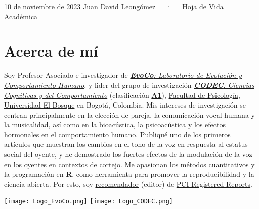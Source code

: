 \documentclass[11pt,a4paper,]{awesome-cv}
\begin{document}
\makecvheader

\makecvfooter
  {10 de noviembre de 2023}
    {Juan David Leongómez~~~·~~~Hoja de Vida Académica}
  {\thepage}





\hypertarget{acerca-de-muxed}{%
\section{Acerca de mí}\label{acerca-de-muxed}}

\begin{minipage}[c]{0.85\linewidth}
Soy Profesor Asociado e investigador de \href{https://jdleongomez.info/es/team/}{\textit{\textbf{EvoCo}: Laboratorio de Evolución y Comportamiento Humano}}, y lider del grupo de investigación \href{https://investigaciones.unbosque.edu.co/codec}{\textit{\textbf{CODEC}: Ciencias Cognitivas y del Comportamiento}} (clasificación  \href{https://scienti.minciencias.gov.co/gruplac/jsp/visualiza/visualizagr.jsp?nro=00000000001446}{\textbf{A1}}),  \href{https://www.uelbosque.edu.co/psicologia}{Facultad de Psicología}, \href{https://www.uelbosque.edu.co/}{Universidad El Bosque} en Bogotá, Colombia. Mis intereses de investigación se centran principalmente en la elección de pareja, la comunicación vocal humana y la musicalidad, así como en la bioacústica, la psicoacústica y los efectos hormonales en el comportamiento humano. Publiqué uno de los primeros artículos que muestran los cambios en el tono de la voz en respuesta al estatus social del oyente, y he demostrado los fuertes efectos de la modulación de la voz en los oyentes en contextos de cortejo. Me apasionan los métodos cuantitativos y la programación en \textbf{R}, como herramienta para promover la reproducibilidad y la ciencia abierta. Por esto, soy \href{https://rr.peercommunityin.org/about/recommenders}{recomendador} (editor) de \href{https://rr.peercommunityin.org/}{PCI Registered Reports}.
\end{minipage} \begin{minipage}[c]{0.15\linewidth}
\begin{flushright} 
\hfill \href{https://jdleongomez.info/es/team/}{\texttt{[image: Logo\_EvoCo.png]}} \newline \href{https://investigaciones.unbosque.edu.co/codec}{\texttt{[image: Logo\_CODEC.png]}}
\end{flushright}
\end{minipage}
\end{document}
